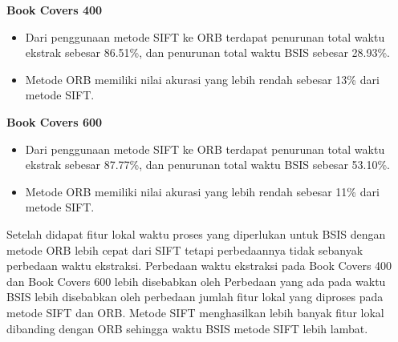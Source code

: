 \noindent\textbf{Book Covers 400} 
\begin{itemize}
	\item Dari penggunaan metode SIFT ke ORB terdapat penurunan total waktu ekstrak sebesar 86.51\%, dan penurunan total waktu BSIS sebesar 28.93\%.
	\item Metode ORB memiliki nilai akurasi yang lebih rendah sebesar 13\% dari metode SIFT.
\end{itemize} 
\noindent\textbf{Book Covers 600} 
\begin{itemize}
	\item Dari penggunaan metode SIFT ke ORB terdapat penurunan total waktu ekstrak sebesar 87.77\%, dan penurunan total waktu BSIS sebesar 53.10\%.
	\item Metode ORB memiliki nilai akurasi yang lebih rendah sebesar 11\% dari metode SIFT.
\end{itemize} 

Setelah didapat fitur lokal waktu proses yang diperlukan untuk BSIS dengan metode ORB lebih cepat dari SIFT tetapi perbedaannya tidak sebanyak perbedaan waktu ekstraksi. Perbedaan waktu ekstraksi pada Book Covers 400 dan Book Covers 600 lebih disebabkan oleh  Perbedaan yang ada pada waktu BSIS lebih disebabkan oleh perbedaan jumlah fitur lokal yang diproses pada metode SIFT dan ORB. Metode SIFT menghasilkan lebih banyak fitur lokal dibanding dengan ORB sehingga waktu BSIS metode SIFT lebih lambat.

